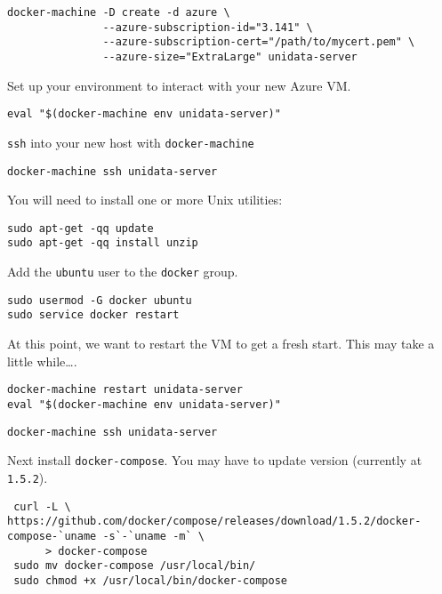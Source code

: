 \documentclass[11pt]{article}
\begin{document}
\begin{verbatim}
docker-machine -D create -d azure \
               --azure-subscription-id="3.141" \
               --azure-subscription-cert="/path/to/mycert.pem" \
               --azure-size="ExtraLarge" unidata-server
\end{verbatim}

Set up your environment to interact with your new Azure VM.

\begin{verbatim}
eval "$(docker-machine env unidata-server)"
\end{verbatim}

\texttt{ssh} into your new host with \texttt{docker-machine}

\begin{verbatim}
docker-machine ssh unidata-server
\end{verbatim}


You will need to install one or more Unix utilities:

\begin{verbatim}
sudo apt-get -qq update
sudo apt-get -qq install unzip
\end{verbatim}

Add the \texttt{ubuntu} user to the \texttt{docker} group.

\begin{verbatim}
sudo usermod -G docker ubuntu
sudo service docker restart
\end{verbatim}

At this point, we want to restart the VM to get a fresh start. This may take a little while\ldots{}.

\begin{verbatim}
docker-machine restart unidata-server
eval "$(docker-machine env unidata-server)"
\end{verbatim}

\begin{verbatim}
docker-machine ssh unidata-server
\end{verbatim}

Next install \texttt{docker-compose}. You may have to update version (currently at \texttt{1.5.2}).

\begin{verbatim}
 curl -L \
https://github.com/docker/compose/releases/download/1.5.2/docker-compose-`uname -s`-`uname -m` \
      > docker-compose
 sudo mv docker-compose /usr/local/bin/
 sudo chmod +x /usr/local/bin/docker-compose
\end{verbatim}
\end{document}
